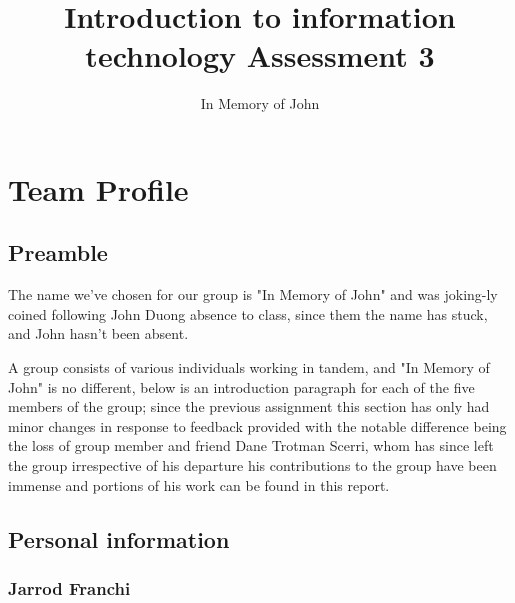 \documentclass[a4paper,12pt]{extreport}
\title{Introduction to information technology Assessment 3}
\author{In Memory of John}
\begin{document}
\maketitle


\tableofcontents
{}

\chapter*{Team Profile}
  \section*{Preamble}
  The name we've chosen for our group is "In Memory of John" and was joking-ly coined following John Duong absence to class, since them the name has stuck, and John hasn't been absent.\newline 

  A group consists of various individuals working in tandem, and "In Memory of John" is no different, below is an introduction paragraph for each of the five members of the group; since the previous assignment this section has only had minor changes in response to feedback provided with the notable difference being the loss of group member and friend Dane Trotman Scerri, whom has since left the group irrespective of his departure his contributions to the group have been immense and portions of his work can be found in this report.
	\section{Personal information}

	  \subsection*{Jarrod Franchi}
\end{document}
